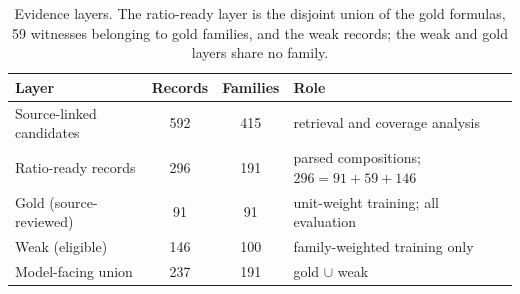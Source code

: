 \documentclass[applsci,article,submit,oneauthor]{Definitions/mdpi}
\begin{document}
\begin{table}[H]
\caption{Evidence layers. The ratio-ready layer is the disjoint union of the gold formulas, 59 witnesses belonging to gold families, and the weak records; the weak and gold layers share no family.}
\label{tab:layers}
\small
\begin{tabularx}{\textwidth}{lccL}
\toprule
\textbf{Layer} & \textbf{Records} & \textbf{Families} & \textbf{Role} \\
\midrule
Source-linked candidates & 592 & 415 & retrieval and coverage analysis \\
Ratio-ready records & 296 & 191 & parsed compositions; $296=91+59+146$ \\
Gold (source-reviewed) & 91 & 91 & unit-weight training; all evaluation \\
Weak (eligible) & 146 & 100 & family-weighted training only \\
Model-facing union & 237 & 191 & gold $\cup$ weak \\
\bottomrule
\end{tabularx}
\end{table}
\end{document}
